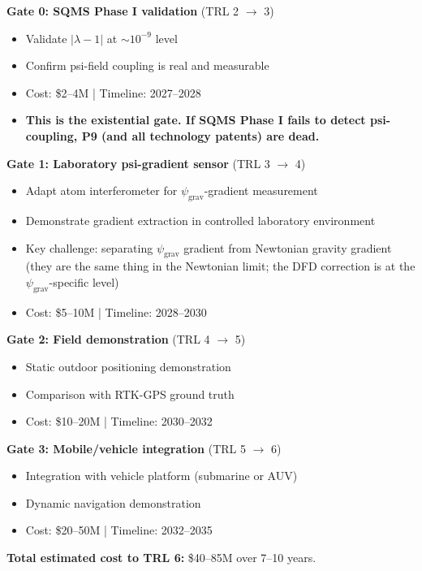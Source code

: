 \documentclass[11pt]{article}
\theoremstyle{definition}
\theoremstyle{remark}
\newcommand{\lambdaone}{|\lambda-1|}
\newcommand{\psigrav}{\psi_{\mathrm{grav}}}
\begin{document}
\begin{tcolorbox}[colback=red!5!white, colframe=red!50!black,
  title=\textbf{P9 Critical Path to Deployment}]

\textbf{Gate 0: SQMS Phase I validation} (TRL 2 $\to$ 3)
\begin{itemize}[nosep]
\item Validate $\lambdaone$ at $\sim 10^{-9}$ level
\item Confirm psi-field coupling is real and measurable
\item Cost: \$2--4M | Timeline: 2027--2028
\item \textbf{This is the existential gate. If SQMS Phase I fails to detect
  psi-coupling, P9 (and all technology patents) are dead.}
\end{itemize}

\textbf{Gate 1: Laboratory psi-gradient sensor} (TRL 3 $\to$ 4)
\begin{itemize}[nosep]
\item Adapt atom interferometer for $\psigrav$-gradient measurement
\item Demonstrate gradient extraction in controlled laboratory environment
\item Key challenge: separating $\psigrav$ gradient from Newtonian gravity gradient
  (they are the same thing in the Newtonian limit; the DFD correction is at the
  $\psigrav$-specific level)
\item Cost: \$5--10M | Timeline: 2028--2030
\end{itemize}

\textbf{Gate 2: Field demonstration} (TRL 4 $\to$ 5)
\begin{itemize}[nosep]
\item Static outdoor positioning demonstration
\item Comparison with RTK-GPS ground truth
\item Cost: \$10--20M | Timeline: 2030--2032
\end{itemize}

\textbf{Gate 3: Mobile/vehicle integration} (TRL 5 $\to$ 6)
\begin{itemize}[nosep]
\item Integration with vehicle platform (submarine or AUV)
\item Dynamic navigation demonstration
\item Cost: \$20--50M | Timeline: 2032--2035
\end{itemize}

\textbf{Total estimated cost to TRL 6:} \$40--85M over 7--10 years.
\end{tcolorbox}
\end{document}
